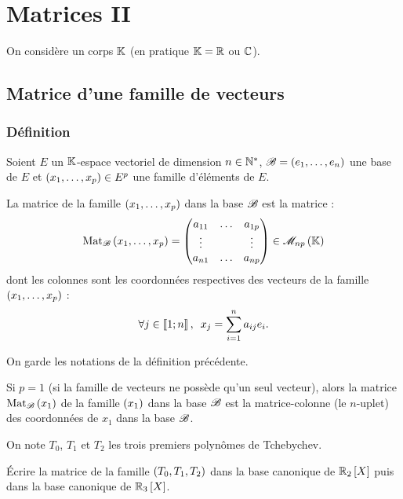 \chapter{Matrices II}

\minitoc

On considère un corps \(\mathbb{K}\) (en pratique \(\mathbb{K}=\mathbb{R}\) ou \(\mathbb{C}\)).

\section{Matrice d'une famille de vecteurs}

\subsection{Définition}

\begin{defi}
Soient \(E\) un \(\mathbb{K}\)-espace vectoriel de dimension \(n\in\mathbb{N}^*\), \(\mathscr{B}=\left(e_1,\dots,e_n\right)\) une base de \(E\) et \(\left(x_1,\dots,x_p\right)\in E^p\) une famille d'éléments de \(E\).

La matrice de la famille \(\left(x_1,\dots,x_p\right)\) dans la base \(\mathscr{B}\) est la matrice : \[\Mat{x_1,\dots,x_p}=\begin{pmatrix}
a_{11} & \dots & a_{1p} \\
\vdots &  & \vdots \\
a_{n1} & \dots & a_{np}
\end{pmatrix}\in\M{np}\] dont les colonnes sont les coordonnées respectives des vecteurs de la famille \(\left(x_1,\dots,x_p\right)\) : \[\quantifs{\forall j\in\interventierii{1}{n}}x_j=\sum_{i=1}^{n}a_{ij}e_i.\]
\end{defi}

\begin{rem}
On garde les notations de la définition précédente.

Si \(p=1\) (\cad si la famille de vecteurs ne possède qu'un seul vecteur), alors la matrice \(\Mat{x_1}\) de la famille \(\left(x_1\right)\) dans la base \(\mathscr{B}\) est la matrice-colonne (\cad le \(n\)-uplet) des coordonnées de \(x_1\) dans la base \(\mathscr{B}\).
\end{rem}

\begin{exoex}
On note \(T_0\), \(T_1\) et \(T_2\) les trois premiers polynômes de Tchebychev.

Écrire la matrice de la famille \(\left(T_0,T_1,T_2\right)\) dans la base canonique de \(\polydeg[\R]{2}\) puis dans la base canonique de \(\polydeg[\R]{3}\).
\end{exoex}

